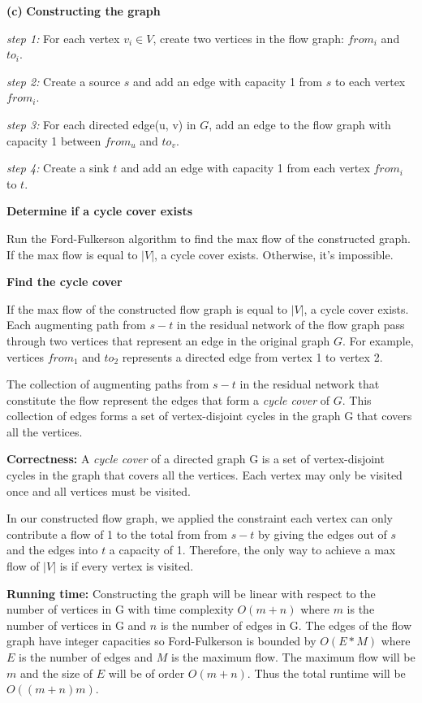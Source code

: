 \documentclass[11pt]{article}
\renewcommand\part[1]{\vspace{.10in}\textbf{(#1)}}
\newcommand\correctness{\vspace{.10in}\textbf{Correctness: }}
\newcommand\runtime{\vspace{.10in}\textbf{Running time: }}
\begin{document}

\part{c} \textbf{Constructing the graph} 

\textit{step 1:} For each vertex $v_i \in V$, create two vertices in the flow graph: $from_i$ and $to_i$.

\textit{step 2:} Create a source $s$ and add an edge with capacity 1 from $s$ to each vertex $from_i$. 

\textit{step 3:} For each directed edge(u, v) in $G$, add an edge to the flow graph with capacity 1 between $from_u$ and $to_v$.

\textit{step 4: } Create a sink $t$ and add an edge with capacity 1 from each vertex $from_i$ to $t$.

\textbf{Determine if a cycle cover exists} 

Run the Ford-Fulkerson algorithm to find the max flow of the constructed graph. If the max flow is equal to $|V|$, a cycle cover exists. Otherwise, it's impossible.

\textbf{Find the cycle cover}

If the max flow of the constructed flow graph is equal to $|V|$, a cycle cover exists. Each augmenting path from $s-t$ in the residual network of the flow graph pass through two vertices that represent an edge in the original graph $G$. For example, vertices $from_1$ and $to_2$ represents a directed edge from vertex 1 to vertex 2. 

The collection of augmenting paths from $s-t$ in the residual network that constitute the flow represent the edges that form a \textit{cycle cover} of $G$. This collection of edges forms a set of vertex-disjoint cycles in the graph G that covers all the vertices.

\correctness A \textit{cycle cover} of a directed graph G is a set of vertex-disjoint cycles in the graph that covers all the vertices. Each vertex may only be visited once and all vertices must be visited. 

In our constructed flow graph, we applied the constraint each vertex can only contribute a flow of 1 to the total from from $s-t$ by giving the edges out of $s$ and the edges into $t$ a capacity of 1. Therefore, the only way to achieve a max flow of $|V|$ is if every vertex is visited. 

\runtime Constructing the graph will be linear with respect to the number of vertices in G with time complexity $O(m + n)$ where $m$ is the number of vertices in G and $n$ is the number of edges in G. The edges of the flow graph have integer capacities so Ford-Fulkerson is bounded by $O(E * M)$ where $E$ is the number of edges and $M$ is the maximum flow. The maximum flow will be $m$ and the size of $E$ will be of order $O(m + n)$. Thus the total runtime will be $O((m + n)m)$.
\end{document}
